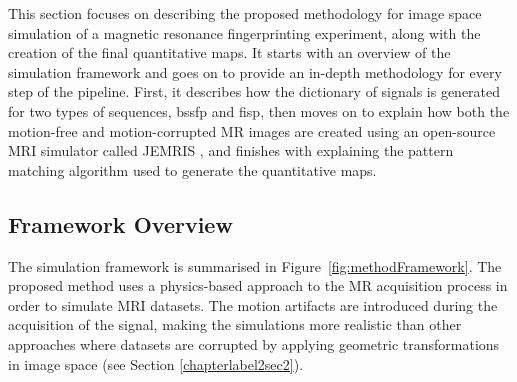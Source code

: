 
This section focuses on describing the proposed methodology for image space simulation of a magnetic resonance fingerprinting experiment, along with the creation of the final quantitative maps.
It starts with an overview of the simulation framework and goes on to provide an in-depth methodology for every step of the pipeline.
First, it describes how the dictionary of signals is generated for two types of sequences, \ac{bssfp} and \ac{fisp}, 
then moves on to explain how both the motion-free and motion-corrupted MR images are created using an open-source MRI simulator called JEMRIS \cite{Stocker2010},
and finishes with explaining the pattern matching algorithm used to generate the quantitative maps.

\subsection{Framework Overview}
\label{method:overview}

The simulation framework is summarised in Figure~\ref{fig:methodFramework}.
The proposed method uses a physics-based approach to the MR acquisition process in order to simulate MRI datasets.
The motion artifacts are introduced during the acquisition of the signal, making the simulations more realistic than other approaches where datasets are corrupted by applying geometric transformations in image space (see Section \ref{chapterlabel2sec2}).

